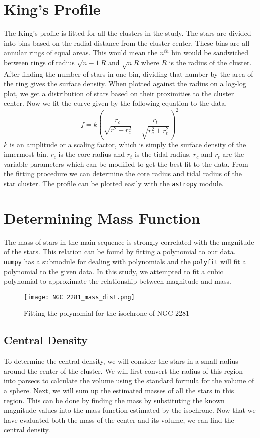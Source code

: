 \section{King's Profile}
The King's profile\citep{kingprofile} is fitted for all the clusters in the study. The stars are divided into bins based on the radial distance from the cluster center. These bins are all annular rings of equal areas. This would mean the $n^{th}$ bin would be sandwiched between rings of radius $\sqrt{n-1}R$ and $\sqrt{n}R$ where $R$ is the radius of the cluster. After finding the number of stars in one bin, dividing that number by the area of the ring gives the surface density. When plotted against the radius on a log-log plot, we get a distribution of stars based on their proximities to the cluster center. Now we fit the curve given by the following equation to the data.
$$f = k \left( \frac{r_c}{\sqrt{r^2+r_c^2}} - \frac{r_t}{\sqrt{r_c^2+r_t^2}} \right) ^2$$
$k$ is an amplitude or a scaling factor, which is simply the surface density of the innermost bin. $r_c$ is the core radius and $r_t$ is the tidal radius.  $r_c$ and $r_t$ are the variable parameters which can be modified to get the best fit to the data. From the fitting procedure we can determine the core radius and tidal radius of the star cluster. The profile can be plotted easily with the \lstinline{astropy} {} module.

\section{Determining Mass Function}
The mass of stars in the main sequence is strongly correlated with the magnitude of the stars. This relation can be found by fitting a polynomial to our data. \lstinline{numpy} {}has a submodule for dealing with polynomials and the \lstinline{polyfit} {}will fit a polynomial to the given data. In this study, we attempted to fit a cubic polynomial to approximate the relationship between magnitude and mass. 

\begin{figure}[h]
	\centering
	\texttt{[image: NGC 2281\_mass\_dist.png]}
	\caption{Fitting the polynomial for the isochrone of NGC 2281}
	\label{fig:im6}
\end{figure}

\subsection{Central Density}
To determine the central density, we will consider the stars in a small radius around the center of the cluster. We will first convert the radius of this region into parsecs to calculate the volume using the standard formula for the volume of a sphere. Next, we will sum up the estimated masses of all the stars in this region. This can be done by finding the mass by substituting the known magnitude values into the mass function estimated by the isochrone. Now that we have evaluated both the mass of the center and its volume, we can find the central density.

